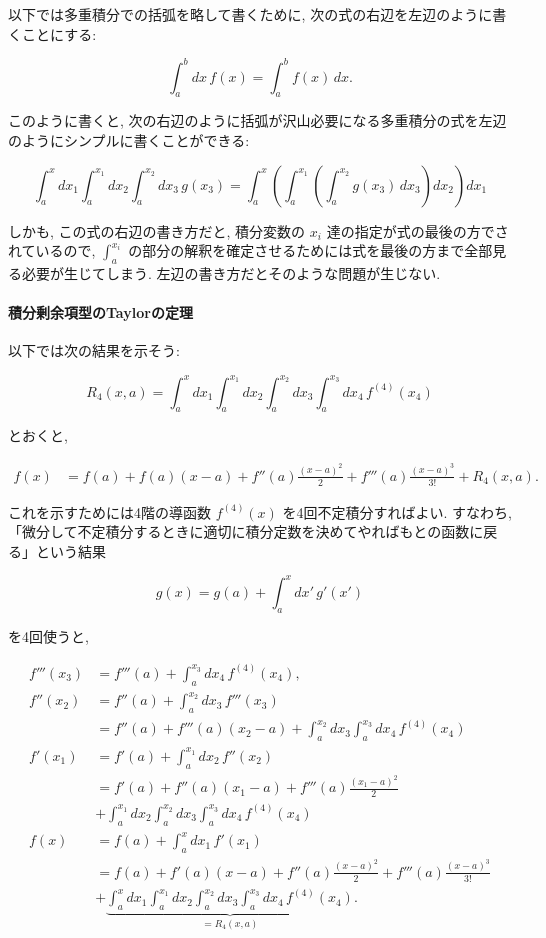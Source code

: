 \documentclass[10pt, a4paper,xelatex,ja=standard]{bxjsarticle}
\begin{document}
以下では多重積分での括弧を略して書くために,
次の式の右辺を左辺のように書くことにする:

\[
\int_a^b dx\,f(x) = \int_a^b f(x)\,dx.
\]

このように書くと,
次の右辺のように括弧が沢山必要になる多重積分の式を左辺のようにシンプルに書くことができる:

\[
\int_a^x dx_1\int_a^{x_1}dx_2\int_a^{x_2}dx_3\,g(x_3) =
\int_a^x\left(\int_a^{x_1}\left(\int_a^{x_2}g(x_3)\,dx_3\right)dx_2\right)dx_1
\]

しかも, この式の右辺の書き方だと, 積分変数の \(x_i\)
達の指定が式の最後の方でされているので, \(\int_a^{x_i}\)
の部分の解釈を確定させるためには式を最後の方まで全部見る必要が生じてしまう.
左辺の書き方だとそのような問題が生じない.

    \hypertarget{ux7a4dux5206ux5270ux4f59ux9805ux578bux306etaylorux306eux5b9aux7406}{%
\paragraph{積分剰余項型のTaylorの定理}\label{ux7a4dux5206ux5270ux4f59ux9805ux578bux306etaylorux306eux5b9aux7406}}

以下では次の結果を示そう:

\[
R_4(x, a) = \int_a^x dx_1\int_a^{x_1}dx_2\int_a^{x_2}dx_3\int_a^{x_3}dx_4\, f^{(4)}(x_4)
\]

とおくと,

\[
\begin{aligned}
f(x) &= f(a) + f(a)(x-a) + f''(a)\frac{(x-a)^2}{2} + f'''(a)\frac{(x-a)^3}{3!} + R_4(x,a).
\end{aligned}
\]

これを示すためには4階の導函数 \(f^{(4)}(x)\) を4回不定積分すればよい.
すなわち,
「微分して不定積分するときに適切に積分定数を決めてやればもとの函数に戻る」という結果

\[
g(x) = g(a) + \int_a^x dx'\,g'(x') 
\]

を4回使うと,

\[
\begin{aligned}
f'''(x_3) &= f'''(a) + \int_a^{x_3}dx_4\,f^{(4)}(x_4),
\\
f''(x_2) &= f''(a) + \int_a^{x_2}dx_3\,f'''(x_3)
\\ &=
f''(a) + f'''(a)(x_2 - a) + \int_a^{x_2}dx_3\int_a^{x_3}dx_4\,f^{(4)}(x_4)
\\
f'(x_1) &= f'(a) + \int_a^{x_1}dx_2\,f''(x_2)
\\ &=
f'(a) + f''(a)(x_1 - a) + f'''(a)\frac{(x_1 - a)^2}{2}
\\ &+
\int_a^{x_1}dx_2\int_a^{x_2}dx_3\int_a^{x_3}dx_4\,f^{(4)}(x_4)
\\
f(x) &= f(a) + \int_a^{x}dx_1\,f'(x_1)
\\ &=
f(a) + f'(a)(x - a) + f''(a)\frac{(x - a)^2}{2} + f'''(a)\frac{(x - a)^3}{3!}
\\ &+
\underbrace{
\int_a^{x}dx_1\int_a^{x_1}dx_2\int_a^{x_2}dx_3\int_a^{x_3}dx_4\,f^{(4)}(x_4)
}_{=R_4(x,a)}.
\end{aligned}
\]
\end{document}
